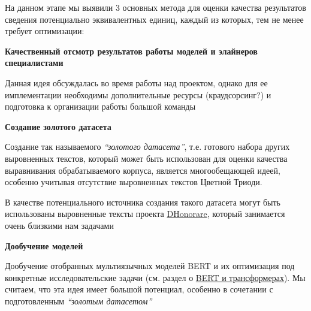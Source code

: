 \documentclass[
  letterpaper,
]{book}
\begin{document}
На данном этапе мы выявили 3 основных метода для оценки качества
результатов сведения потенциально эквивалентных единиц, каждый из
которых, тем не менее требует оптимизации:

\begin{tcolorbox}[enhanced jigsaw, rightrule=.15mm, breakable, colframe=quarto-callout-note-color-frame, colback=white, leftrule=.75mm, left=2mm, arc=.35mm, opacityback=0, toprule=.15mm, bottomrule=.15mm]

\textbf{Качественный отсмотр результатов работы моделей и элайнеров
специалистами}\vspace{2mm}

Данная идея обсуждалась во время работы над проектом, однако для ее
имплементации необходимы дополнительные ресурсы (краудсорсинг?) и
подготовка к организации работы большой команды

\end{tcolorbox}

\begin{tcolorbox}[enhanced jigsaw, rightrule=.15mm, breakable, colframe=quarto-callout-note-color-frame, colback=white, leftrule=.75mm, left=2mm, arc=.35mm, opacityback=0, toprule=.15mm, bottomrule=.15mm]

\textbf{Создание золотого датасета}\vspace{2mm}

Создание так называемого \emph{``золотого датасета''}, т.е. готового
набора других выровненных текстов, который может быть использован для
оценки качества выравнивания обрабатываемого корпуса, является
многообещающей идеей, особенно учитывая отсутствие выровненных текстов
Цветной Триоди.

В качестве потенциального источника создания такого датасета могут быть
использованы выровненные тексты проекта
\href{https://dhonorare.ru/texts/trebnik/molitvy-v-pervyy-den-posle-rozhdeniya-mladentsa}{DHonorare},
который занимается очень близкими нам задачами

\end{tcolorbox}

\begin{tcolorbox}[enhanced jigsaw, rightrule=.15mm, breakable, colframe=quarto-callout-note-color-frame, colback=white, leftrule=.75mm, left=2mm, arc=.35mm, opacityback=0, toprule=.15mm, bottomrule=.15mm]

\textbf{Дообучение моделей}\vspace{2mm}

Дообучение отобранных мультиязычных моделей BERT и их оптимизация под
конкретные исследовательские задачи (см. раздел о
\protect\hyperlink{sec-about_bert}{BERT и трансформерах}). Мы считаем,
что эта идея имеет большой потенциал, особенно в сочетании с
подготовленным \emph{``золотым датасетом''}

\end{tcolorbox}
\end{document}
